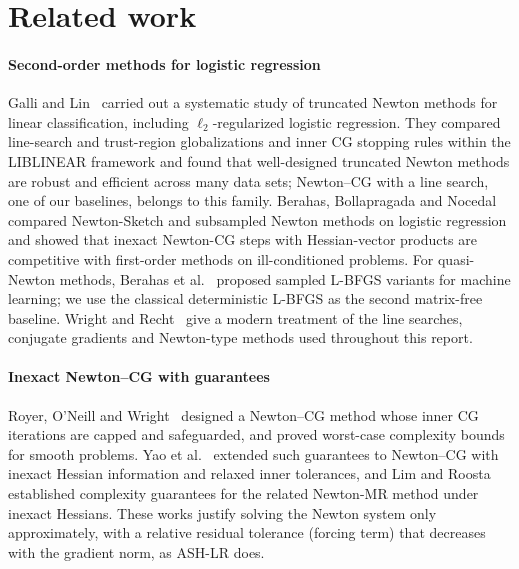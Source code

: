 \section{Related work}\label{sec:related}

\paragraph{Second-order methods for logistic regression}
Galli and Lin~\cite{galli2022truncated} carried out a systematic study of truncated
Newton methods for linear classification, including $\ell_2$-regularized logistic
regression. They compared line-search and trust-region globalizations and inner CG
stopping rules within the LIBLINEAR framework and found that well-designed truncated
Newton methods are robust and efficient across many data sets; Newton--CG with a line
search, one of our baselines, belongs to this family. Berahas, Bollapragada and
Nocedal~\cite{berahas2020investigation} compared Newton-Sketch and subsampled Newton
methods on logistic regression and showed that inexact Newton-CG steps with
Hessian-vector products are competitive with first-order methods on ill-conditioned
problems. For quasi-Newton methods, Berahas et al.~\cite{berahas2022quasi} proposed
sampled L-BFGS variants for machine learning; we use the classical deterministic
L-BFGS as the second matrix-free baseline. Wright and
Recht~\cite{wright2022optimization} give a modern treatment of the line searches,
conjugate gradients and Newton-type methods used throughout this report.

\paragraph{Inexact Newton--CG with guarantees}
Royer, O'Neill and Wright~\cite{royer2020newton} designed a Newton--CG method whose
inner CG iterations are capped and safeguarded, and proved worst-case complexity
bounds for smooth problems. Yao et al.~\cite{yao2023inexact} extended such guarantees
to Newton--CG with inexact Hessian information and relaxed inner tolerances, and Lim
and Roosta~\cite{lim2026complexity} established complexity guarantees for the related
Newton-MR method under inexact Hessians. These works justify solving the Newton
system only approximately, with a relative residual tolerance (forcing term) that
decreases with the gradient norm, as ASH-LR does.

